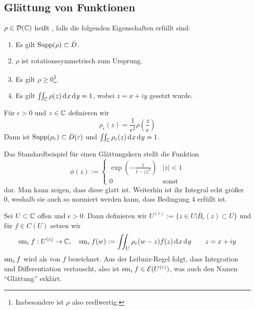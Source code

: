 \subsection{Glättung von Funktionen}
\label{sec:Glättung}

\begin{defin}[Glättungskern]
  $\rho \in \mathcal{D}(\mathbb{C})$ heißt , falls die folgenden
  Eigenschaften erfüllt sind:
  \begin{enumerate}
  \item Es gilt $\operatorname{Supp}(\rho) \subset \bar D$.
  \item $\rho$ ist rotationssymmetrisch zum Ursprung.
  \item Es gilt $\rho \geq 0$\footnote{Insbesondere ist $\rho$ also reellwertig.}.
  \item Es gilt $\iint_\C \rho(z) \d[x]\d[y] = 1$, wobei $z = x + iy$
    gesetzt wurde.
  \end{enumerate}
  Für $\epsilon > 0$ und $z \in \mathbb{C}$ definieren wir
  \[
  \rho_\epsilon(z) = \frac{1}{\epsilon^2} \rho\left(
    \frac{z}{\epsilon} \right )
  \]
  Dann ist $\operatorname{Supp}(\rho_\varepsilon) \subset \bar D(\varepsilon)$ und
  $\iint_\C \rho_\epsilon(z) \d[x]\d[y] = 1$.
\end{defin}


\begin{bsp}
  Das Standardbeispiel für einen Glättungskern stellt die Funktion
  \[
  \phi(z) :=
  \begin{cases}
    \exp \left ( - \frac{1}{1 - |z|^2} \right ) & |z| < 1 \\
    0 & \text{sonst}
  \end{cases}
  \]
  dar.
  Man kann zeigen, dass diese glatt ist. Weiterhin ist ihr Integral
  echt größer 0, weshalb sie auch so normiert werden kann, dass
  Bedingung 4 erfüllt ist.
\end{bsp}

\begin{defin}
  Sei $U \subset \mathbb{C}$ offen und $\epsilon > 0$. Dann definieren wir
  $U^{(\epsilon)} := \{z \in U | \bar B_\epsilon(z) \subset U \}$ und
  für $f \in C(U)$ setzen wir
  \[
  \sm_\epsilon f : U^{(\epsilon)} \ra \C, \quad \sm_\epsilon f(w) :=
  \iint_U \rho_\epsilon(w- z) f(z) \d[x]\d[y] \qquad z = x + iy
  \]
  $\operatorname{sm}_\varepsilon f$ wird als  von $f$ bezeichnet. 
  Aus der Leibniz-Regel folgt, dass Integration und Differentiation
  vertauscht, also ist $\operatorname{sm}_\varepsilon f \in \mathcal{E}(U^{(\varepsilon)})$, was
  auch den Namen "`Glättung"' erklärt.
\end{defin}

